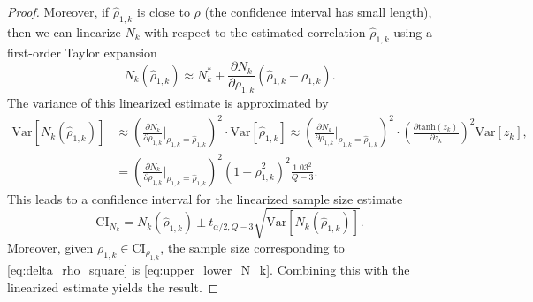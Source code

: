 \begin{proof}
	
	
	
	Moreover, if $\widehat \rho_{1,k}$ is close to $\rho$ (the confidence interval has small length), then we  can linearize $N_k$ with respect to the estimated correlation $\widehat\rho_{1,k}$ using a first-order Taylor expansion
	\[
	N_k\left(\widehat\rho_{1,k}\right)\approx N_k^*+ \frac{\partial N_k}{\partial \rho_{1,k}} \left( \widehat\rho_{1,k}-\rho_{1,k}\right).
	\]
	The variance of this linearized estimate is approximated by
	\begin{align*}
	\text{Var}\left[N_k\left(\widehat\rho_{1,k}\right)\right] &\approx \left(\frac{\partial N_k}{\partial \rho_{1,k}}\Bigg |_{\rho_{1,k} = \widehat\rho_{1,k}} \right)^2 \cdot \text{Var}\left[\widehat\rho_{1,k}\right] \approx \left(\frac{\partial N_k}{\partial \rho_{1,k}}\Bigg |_{\rho_{1,k} = \widehat\rho_{1,k}} \right)^2 \cdot \left(\frac{\partial \text{tanh}(z_k)}{\partial z_k}\right)^2\text{Var}[z_k],\\
	&= \left(\frac{\partial N_k}{\partial \rho_{1,k}}\Bigg |_{\rho_{1,k} = \widehat\rho_{1,k}} \right)^2\left(1-\widehat\rho_{1,k}^2\right)^2\frac{1.03^2}{Q-3}.
	\end{align*}
	This leads to a confidence interval for the linearized sample size estimate
	\[
	\text{CI}_{N_k} = N_k\left(\widehat\rho_{1,k}\right)\pm t_{\alpha/2,Q-3}\sqrt{\text{Var}\left[N_k\left(\widehat\rho_{1,k}\right)\right]}.
	\]
	Moreover, given $\rho_{1,k}\in \text{CI}_{\rho_{1,k}}$, the sample size corresponding to \eqref{eq:delta_rho_square} is \eqref{eq:upper_lower_N_k}. Combining this with the linearized estimate yields the result.
\end{proof}


